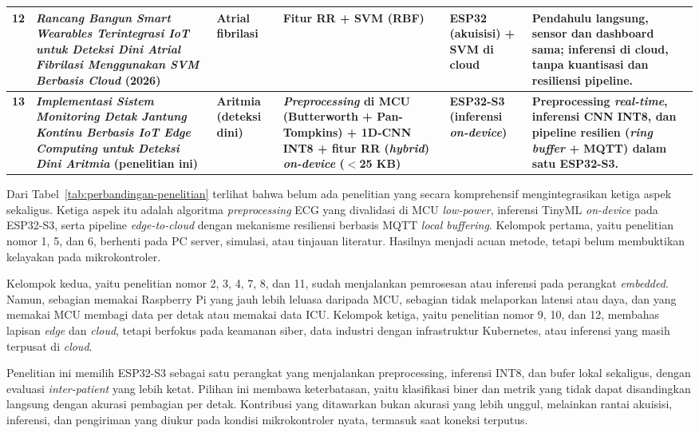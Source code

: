 {\begin{longtable}{|c|L{3.5cm}|L{2.0cm}|L{2.0cm}|L{1.8cm}|L{2.8cm}|}
12 & \textit{Rancang Bangun Smart Wearables Terintegrasi IoT untuk Deteksi Dini Atrial Fibrilasi Menggunakan SVM Berbasis Cloud} (2026) & Atrial fibrilasi & Fitur RR + SVM (RBF) & ESP32 (akuisisi) + SVM di cloud & Pendahulu langsung, sensor dan dashboard sama; inferensi di cloud, tanpa kuantisasi dan resiliensi pipeline. \\ \hline

\textbf{13} & \textbf{\textit{Implementasi Sistem Monitoring Detak Jantung Kontinu Berbasis IoT Edge Computing untuk Deteksi Dini Aritmia} (penelitian ini)} & \textbf{Aritmia (deteksi dini)} & \textbf{\textit{Preprocessing} di MCU (Butterworth + Pan-Tompkins) + 1D-CNN INT8 + fitur RR (\textit{hybrid}) \textit{on-device} ($<$25 KB)} & \textbf{ESP32-S3 (inferensi \textit{on-device})} & \textbf{Preprocessing \textit{real-time}, inferensi CNN INT8, dan pipeline resilien (\textit{ring buffer} + MQTT) dalam satu ESP32-S3.} \\ \hline

\end{longtable}
}

Dari Tabel~\ref{tab:perbandingan-penelitian} terlihat bahwa belum ada penelitian yang secara komprehensif mengintegrasikan ketiga aspek sekaligus. Ketiga aspek itu adalah algoritma \textit{preprocessing} ECG yang divalidasi di MCU \textit{low-power}, inferensi TinyML \textit{on-device} pada ESP32-S3, serta pipeline \textit{edge-to-cloud} dengan mekanisme resiliensi berbasis MQTT \textit{local buffering}. Kelompok pertama, yaitu penelitian nomor 1, 5, dan 6, berhenti pada PC server, simulasi, atau tinjauan literatur. Hasilnya menjadi acuan metode, tetapi belum membuktikan kelayakan pada mikrokontroler.

Kelompok kedua, yaitu penelitian nomor 2, 3, 4, 7, 8, dan 11, sudah menjalankan pemrosesan atau inferensi pada perangkat \textit{embedded}. Namun, sebagian memakai Raspberry Pi yang jauh lebih leluasa daripada MCU, sebagian tidak melaporkan latensi atau daya, dan yang memakai MCU membagi data per detak atau memakai data ICU. Kelompok ketiga, yaitu penelitian nomor 9, 10, dan 12, membahas lapisan \textit{edge} dan \textit{cloud}, tetapi berfokus pada keamanan siber, data industri dengan infrastruktur Kubernetes, atau inferensi yang masih terpusat di \textit{cloud}.

Penelitian ini memilih ESP32-S3 sebagai satu perangkat yang menjalankan preprocessing, inferensi INT8, dan bufer lokal sekaligus, dengan evaluasi \textit{inter-patient} yang lebih ketat. Pilihan ini membawa keterbatasan, yaitu klasifikasi biner dan metrik yang tidak dapat disandingkan langsung dengan akurasi pembagian per detak. Kontribusi yang ditawarkan bukan akurasi yang lebih unggul, melainkan rantai akuisisi, inferensi, dan pengiriman yang diukur pada kondisi mikrokontroler nyata, termasuk saat koneksi terputus.
